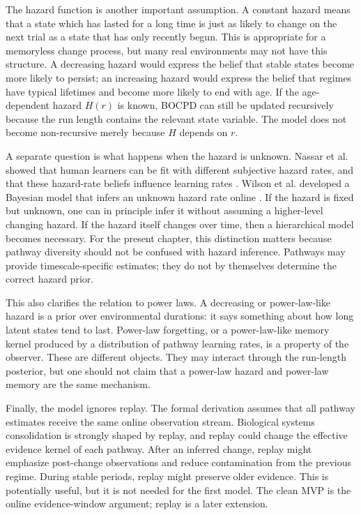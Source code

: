 The hazard function is another important assumption. A constant hazard means that a state which has lasted for a long time is just as likely to change on the next trial as a state that has only recently begun. This is appropriate for a memoryless change process, but many real environments may not have this structure. A decreasing hazard would express the belief that stable states become more likely to persist; an increasing hazard would express the belief that regimes have typical lifetimes and become more likely to end with age. If the age-dependent hazard \(H(r)\) is known, BOCPD can still be updated recursively because the run length contains the relevant state variable. The model does not become non-recursive merely because \(H\) depends on \(r\).

A separate question is what happens when the hazard is unknown. Nassar et al. showed that human learners can be fit with different subjective hazard rates, and that these hazard-rate beliefs influence learning rates \citep{Nassar2010}. Wilson et al. developed a Bayesian model that infers an unknown hazard rate online \citep{Wilson2010}. If the hazard is fixed but unknown, one can in principle infer it without assuming a higher-level changing hazard. If the hazard itself changes over time, then a hierarchical model becomes necessary. For the present chapter, this distinction matters because pathway diversity should not be confused with hazard inference. Pathways may provide timescale-specific estimates; they do not by themselves determine the correct hazard prior.

This also clarifies the relation to power laws. A decreasing or power-law-like hazard is a prior over environmental durations: it says something about how long latent states tend to last. Power-law forgetting, or a power-law-like memory kernel produced by a distribution of pathway learning rates, is a property of the observer. These are different objects. They may interact through the run-length posterior, but one should not claim that a power-law hazard and power-law memory are the same mechanism.

Finally, the model ignores replay. The formal derivation assumes that all pathway estimates receive the same online observation stream. Biological systems consolidation is strongly shaped by replay, and replay could change the effective evidence kernel of each pathway. After an inferred change, replay might emphasize post-change observations and reduce contamination from the previous regime. During stable periods, replay might preserve older evidence. This is potentially useful, but it is not needed for the first model. The clean MVP is the online evidence-window argument; replay is a later extension.

